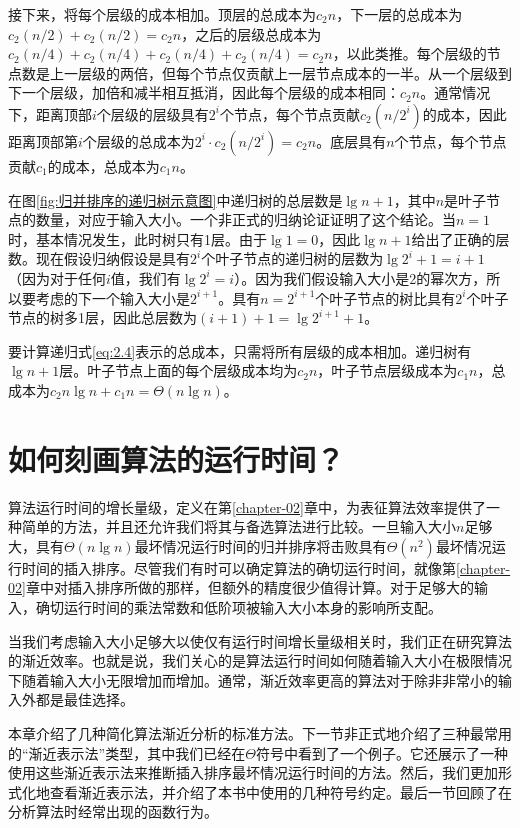 \documentclass[lang=cn,newtx,10pt,scheme=chinese]{elegantbook}
\begin{document}
接下来，将每个层级的成本相加。顶层的总成本为$c_2n$，下一层的总成本为$c_2(n / 2)+c_2(n / 2)=c_2 n$，之后的层级总成本为$c_2(n / 4)+c_2(n / 4)+c_2(n / 4)+c_2(n / 4)=c_2 n$，以此类推。每个层级的节点数是上一层级的两倍，但每个节点仅贡献上一层节点成本的一半。从一个层级到下一个层级，加倍和减半相互抵消，因此每个层级的成本相同：$c_2n$。通常情况下，距离顶部$i$个层级的层级具有$2^i$个节点，每个节点贡献$c_2(n/2^i)$的成本，因此距离顶部第$i$个层级的总成本为$2^i \cdot c_2(n/2^i)=c_2 n$。底层具有$n$个节点，每个节点贡献$c_1$的成本，总成本为$c_1n$。

在图\ref{fig:归并排序的递归树示意图}中递归树的总层数是$\lg n+1$，其中$n$是叶子节点的数量，对应于输入大小。一个非正式的归纳论证证明了这个结论。当$n=1$时，基本情况发生，此时树只有1层。由于$\lg 1 = 0$，因此$\lg n + 1$给出了正确的层数。现在假设归纳假设是具有$2^i$个叶子节点的递归树的层数为$\lg 2^i+1=i+1$（因为对于任何$i$值，我们有$\lg 2^i=i$）。因为我们假设输入大小是2的幂次方，所以要考虑的下一个输入大小是$2^{i+1}$。具有$n=2^{i+1}$个叶子节点的树比具有$2^i$个叶子节点的树多1层，因此总层数为$(i+1)+1=\lg{2^{i+1}}+1$。

要计算递归式\eqref{eq:2.4}表示的总成本，只需将所有层级的成本相加。递归树有$\lg n + 1$层。叶子节点上面的每个层级成本均为$c_2n$，叶子节点层级成本为$c_1n$，总成本为$c_2 n \lg n + c_1 n = \Theta(n \lg n)$。

\chapter{如何刻画算法的运行时间？}\label{chapter-03}

算法运行时间的增长量级，定义在第\ref{chapter-02}章中，为表征算法效率提供了一种简单的方法，并且还允许我们将其与备选算法进行比较。一旦输入大小$n$足够大，具有$\Theta(n\lg n)$最坏情况运行时间的归并排序将击败具有$\Theta(n^2)$最坏情况运行时间的插入排序。尽管我们有时可以确定算法的确切运行时间，就像第\ref{chapter-02}章中对插入排序所做的那样，但额外的精度很少值得计算。对于足够大的输入，确切运行时间的乘法常数和低阶项被输入大小本身的影响所支配。

当我们考虑输入大小足够大以使仅有运行时间增长量级相关时，我们正在研究算法的渐近效率。也就是说，我们关心的是算法运行时间如何随着输入大小在极限情况下随着输入大小无限增加而增加。通常，渐近效率更高的算法对于除非非常小的输入外都是最佳选择。

本章介绍了几种简化算法渐近分析的标准方法。下一节非正式地介绍了三种最常用的``渐近表示法''类型，其中我们已经在$\Theta$符号中看到了一个例子。它还展示了一种使用这些渐近表示法来推断插入排序最坏情况运行时间的方法。然后，我们更加形式化地查看渐近表示法，并介绍了本书中使用的几种符号约定。最后一节回顾了在分析算法时经常出现的函数行为。
\end{document}
